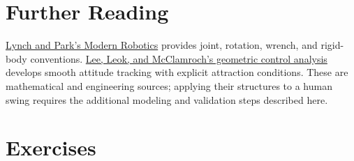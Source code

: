 \documentclass[12pt, openany]{book}
\theoremstyle{plain}
\begin{document}
\section{Further Reading}

\href{https://hades.mech.northwestern.edu/images/2/25/MR-v2.pdf}{Lynch and Park's
Modern Robotics} provides joint, rotation, wrench, and rigid-body conventions.
\href{https://arxiv.org/abs/1003.2005}{Lee, Leok, and McClamroch's geometric
control analysis} develops smooth attitude tracking with explicit attraction
conditions. These are mathematical and engineering sources; applying their
structures to a human swing requires the additional modeling and validation
steps described here.

\section{Exercises}
\end{document}
